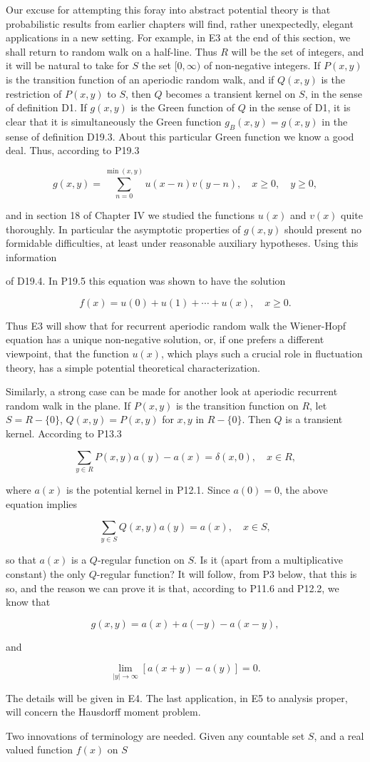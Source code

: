 Our excuse for attempting this foray into abstract potential theory is that probabilistic results from earlier chapters will find, rather unexpectedly, elegant applications in a new setting. For example, in E3 at the end of this section, we shall return to random walk on a half-line. Thus $R$ will be the set of integers, and it will be natural to take for $S$ the set $[0,\infty)$ of non-negative integers. If $P(x,y)$ is the transition function of an aperiodic random walk, and if $Q(x,y)$ is the restriction of $P(x,y)$ to $S$, then $Q$ becomes a transient kernel on $S$, in the sense of definition D1. If $g(x,y)$ is the Green function of $Q$ in the sense of D1, it is clear that it is simultaneously the Green function $g_B(x,y) = g(x,y)$ in the sense of definition D19.3. About this particular Green function we know a good deal. Thus, according to P19.3

$$g(x,y) = \sum_{n=0}^{\min(x,y)} u(x-n)v(y-n), \quad x \geq 0, \quad y \geq 0,$$

and in section 18 of Chapter IV we studied the functions $u(x)$ and $v(x)$ quite thoroughly. In particular the asymptotic properties of $g(x,y)$ should present no formidable difficulties, at least under reasonable auxiliary hypotheses. Using this information

of D19.4. In P19.5 this equation was shown to have the solution

$$f(x) = u(0) + u(1) + \cdots + u(x), \quad x \geq 0.$$

Thus E3 will show that for recurrent aperiodic random walk the Wiener-Hopf equation has a unique non-negative solution, or, if one prefers a different viewpoint, that the function $u(x)$, which plays such a crucial role in fluctuation theory, has a simple potential theoretical characterization.

Similarly, a strong case can be made for another look at aperiodic recurrent random walk in the plane. If $P(x,y)$ is the transition function on $R$, let $S = R - \{0\}$, $Q(x,y) = P(x,y)$ for $x,y$ in $R - \{0\}$. Then $Q$ is a transient kernel. According to P13.3

$$\sum_{y \in R} P(x,y)a(y) - a(x) = \delta(x,0), \quad x \in R,$$

where $a(x)$ is the potential kernel in P12.1. Since $a(0) = 0$, the above equation implies

$$\sum_{y \in S} Q(x,y)a(y) = a(x), \quad x \in S,$$

so that $a(x)$ is a $Q$-regular function on $S$. Is it (apart from a multiplicative constant) the only $Q$-regular function? It will follow, from P3 below, that this is so, and the reason we can prove it is that, according to P11.6 and P12.2, we know that

$$g(x,y) = a(x) + a(-y) - a(x-y),$$

and

$$\lim_{|y| \to \infty} [a(x+y) - a(y)] = 0.$$

The details will be given in E4. The last application, in E5 to analysis proper, will concern the Hausdorff moment problem.

Two innovations of terminology are needed. Given any countable set $S$, and a real valued function $f(x)$ on $S$